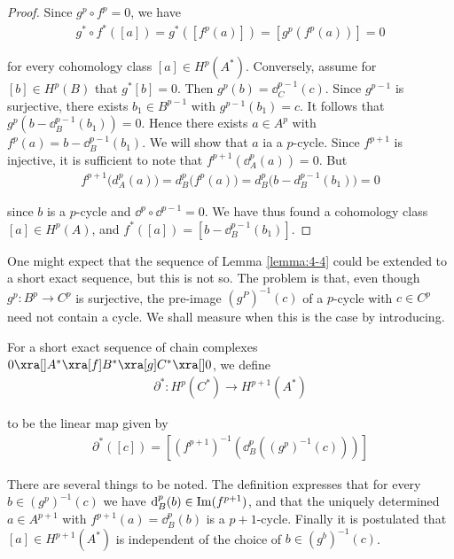 \begin{proof}
  Since $g^p\circ f^p=0$, we have
  \begin{align*}
    g^*\circ f^*([ a ])=g^*([f^p(a)])=[g^p(f^p(a))]=0
  \end{align*}

  for every cohomology class $[a]\in H^p(A^*)$. Conversely, assume for $[b]\in H^p(B)$ that
  $g^*[b] = 0$. Then $g^p(b) = \dd^{p-1}_C(c)$. Since $g^{p-1}$ is surjective, there exists
  $b_1\in B^{p-1}$ with $g^{p-1}(b_1) = c$. It follows that $g^p(b-\dd^{p-1}_B(b_1)) = 0$. Hence
  there exists $a\in A^p$ with $f^p(a) = b-\dd^{p-1}_B(b_1)$. We will show that $a$ ia a $p$-cycle.
  Since $f^{p+1}$ is injective, it is sufficient to note that $f^{p+1}(\dd^p_A(a)) = 0$. But
  \begin{align*}
    f^{p+1}\big(d_A^p(a)\big)=d_B^p\big(f^p(a)\big)=d_B^p\big(b-d_B^{p-1}(b_1)\big) = 0
  \end{align*}

  since $b$ is a $p$-cycle and $\dd^p\circ\dd^{p-1} = 0$. We have thus found a cohomology class
  $[a]\in H^p(A)$, and $f^*([a]) = [b - \dd^{p-1}_B(b_1)]$.
\end{proof}


One might expect that the sequence of Lemma \ref{lemma:4-4} could be extended to a short
exact sequence, but this is not so. The problem is that, even though $g^p:B^p\to C^p$
is surjective, the pre-image $(g^P)^{-1}(c)$ of a $p$-cycle with $c\in C^p$ need not contain
a cycle. We shall measure when this is the case by introducing.


\begin{definition}\label{def:4-5}
  For a short exact sequence of chain complexes $0\xra[]A^*\xra[f]B^*\xra[g]C^*\xra[]0$, we define
  \begin{align*}
    \partial^*: H^p(C^*) \to H^{p+1}(A^*)
  \end{align*}

  to be the linear map given by
  \begin{align*}
    \partial^*([c]) = \left[\left(f^{p+1}\right)^{-1} \left(\dd^p_B\left((g^p)^{-1}(c)\right)\right)\right]
  \end{align*}
\end{definition}

There are several things to be noted. The definition expresses that for every $b\in (g^p)^{-1}(c)$ we have
$\dd^p_B(b)\in\im(f^{p+1})$, and that the uniquely determined $a\in A^{p+1}$ with $f^{p+1}(a) = \dd^p_B(b)$ is a
$p+1$-cycle. Finally it is postulated that $[a]\in H^{p+1}(A^*)$ is independent of the choice of $b\in (g^b)^{-1}(c)$.

